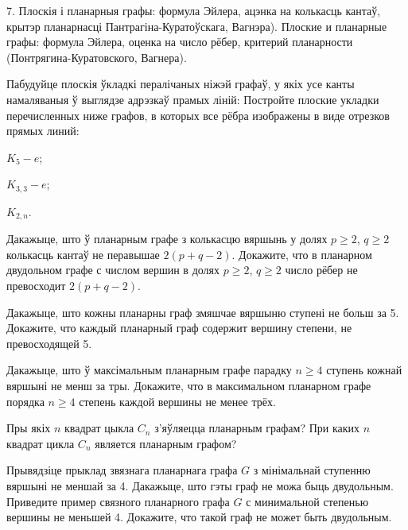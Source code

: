\documentclass[12pt, a4paper]{article}
\begin{document}
    
\biLangHeader
{7. Плоскія і планарныя графы: формула Эйлера, ацэнка на колькасць кантаў, крытэр планарнасці Пантрагіна-Куратоўскага, Вагнэра).}
{Плоские и планарные графы: формула Эйлера, оценка на число рёбер, критерий планарности (Понтрягина-Куратовского, Вагнера).}

\begin{problemList}

\problemItemWithCommonPart
{Пабудуйце плоскія ўкладкі пералічаных ніжэй графаў, у якіх усе канты намаляваныя ў выглядзе адрэзкаў прамых ліній:}
{Постройте плоские укладки перечисленных ниже графов, в которых все рёбра изображены в виде отрезков прямых линий:}
{%
\begin{belarusianEnumerate}
    \item $K_5-e$;
    \item $K_{3, 3}-e$;
    \item $K_{2, n}$.
\end{belarusianEnumerate}
}

\smallskip

\problemItemSimple
{Дакажыце, што ў планарным графе з колькасцю вяршынь у долях $p\ge 2$, $q\ge 2$ колькасць кантаў не перавышае $2(p+q-2)$.}
{Докажите, что в планарном двудольном графе с числом вершин в долях $p\ge 2$, $q\ge 2$ число рёбер не превосходит $2(p+q-2)$.}

\bigskip

\problemItemSimple
{Дакажыце, што кожны планарны граф змяшчае вяршыню ступені не больш за 5.}
{Докажите, что каждый планарный граф содержит вершину степени, не превосходящей 5.}

\bigskip

\problemItemSimple
{Дакажыце, што ў максімальным планарным графе парадку $n\ge 4$ ступень кожнай вяршыні не менш за тры.}
{Докажите, что в максимальном планарном графе порядка $n\ge 4$ степень каждой вершины не менее трёх.}

\bigskip

\problemItemSimple
{Пры якіх $n$ квадрат цыкла $C_n$ з'яўляецца планарным графам?}
{При каких $n$ квадрат цикла $C_n$ является планарным графом?}

\bigskip

\problemItemSimple
{Прывядзіце прыклад звязнага планарнага графа $G$ з мінімальнай ступенню вяршыні не меншай за 4.
Дакажыце, што гэты граф не можа быць двудольным.}
{Приведите пример связного планарного графа $G$ с минимальной степенью вершины не меньшей 4.
Докажите, что такой граф не может быть двудольным.}


\end{problemList}
\end{document}
